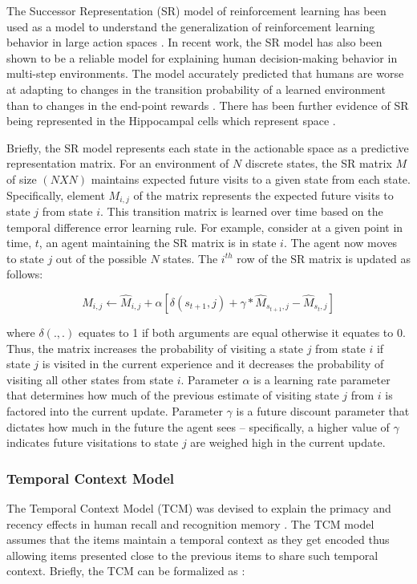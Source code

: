 The Successor Representation (SR) model of reinforcement learning has been used as a model to understand the generalization of reinforcement learning behavior in large action spaces \cite{dayan1993improving}. In recent work, the SR model has also been shown to be a reliable model for explaining human decision-making behavior in multi-step environments. The model accurately predicted that humans are worse at adapting to changes in the transition probability of a learned environment than to changes in the end-point rewards \cite{momennejad2017successor}. There has been further evidence of SR being represented in the Hippocampal cells which represent space \cite{gershman2018successor, stachenfeld2017hippocampus}.

Briefly, the SR model represents each state in the actionable space as a predictive representation matrix. For an environment of $N$ discrete states, the SR matrix $M$ of size $(N X N)$ maintains expected future visits to a given state from each state. Specifically, element $M_{i,j}$ of the matrix represents the expected future visits to state $j$ from state $i$. This transition matrix is learned over time based on the temporal difference error learning rule. For example, consider at a given point in time, $t$, an agent maintaining the SR matrix is in state $i$. The agent now moves to state $j$ out of the possible $N$ states. The $i^{th}$ row of the SR matrix is updated as follows:

\begin{equation}
	M_{i,j} \leftarrow \hat{M}_{i,j} + \alpha[\delta(s_{t+1},j) + \gamma*\hat{M}_{s_{t+1},j} - \hat{M}_{s_t,j}]
\end{equation}

where $\delta(., .)$ equates to 1 if both arguments are equal otherwise it equates to 0. Thus, the matrix increases the probability of visiting a state $j$ from state $i$ if state $j$ is visited in the current experience and it decreases the probability of visiting all other states from state $i$. Parameter $\alpha$ is a learning rate parameter that determines how much of the previous estimate of visiting state $j$ from $i$ is factored into the current update. Parameter $\gamma$ is a future discount parameter that dictates how much in the future the agent sees -- specifically, a higher value of $\gamma$ indicates future visitations to state $j$ are weighed high in the current update.

\subsubsection*{Temporal Context Model}
The Temporal Context Model (TCM) was devised to explain the primacy and recency effects in human recall and recognition memory \cite{howard2005temporal}. The TCM model assumes that the items maintain a temporal context as they get encoded thus allowing items presented close to the previous items to share such temporal context. Briefly, the TCM can be formalized as \cite{gershman2012successor}:

